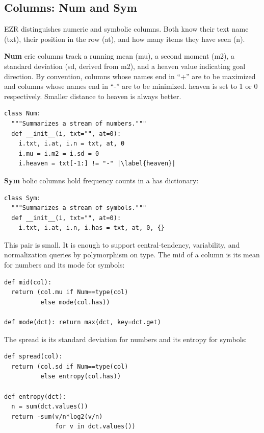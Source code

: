 \documentclass[AMA,STIX2COL]{WileyNJDv5}
\newcommand{\IT}{{\sffamily EZR}}
\newcommand{\cls}[1]{%
  \setlength{\fboxsep}{1.5pt}%
  \colorbox{clsbg}{\sffamily\bfseries{#1}}%
}
\begin{document}
\subsection{Columns: \cls{Num} and \cls{Sym}}

\IT{} distinguishes numeric and symbolic columns. Both know
their text name (\textsf{txt}), their position in the row
(\textsf{at}), and how many items they have seen (\textsf{n}).

\cls{Num}eric columns track a running mean (\textsf{mu}), a
second moment (\textsf{m2}), a standard deviation (\textsf{sd},
derived from \textsf{m2}), and a \textsf{heaven} value
indicating goal direction. By convention, columns whose names
end in ``+'' are to be maximized and columns whose names end in
``-'' are to be minimized. \textsf{heaven} is set to 1 or 0
respectively. Smaller distance to \textsf{heaven} is always
better.

\begin{verbatim}
class Num:
  """Summarizes a stream of numbers."""
  def __init__(i, txt="", at=0):
    i.txt, i.at, i.n = txt, at, 0
    i.mu = i.m2 = i.sd = 0
    i.heaven = txt[-1:] != "-" |\label{heaven}|
\end{verbatim}

\cls{Sym}bolic columns hold frequency counts in a \textsf{has}
dictionary:

\begin{verbatim}
class Sym:
  """Summarizes a stream of symbols."""
  def __init__(i, txt="", at=0):
    i.txt, i.at, i.n, i.has = txt, at, 0, {}
\end{verbatim}

This pair is small. It is enough to support central-tendency,
variability, and normalization queries by polymorphism on type.
The \textsf{mid} of a column is its mean for numbers and its
mode for symbols:

\begin{verbatim}
def mid(col):
  return (col.mu if Num==type(col)
          else mode(col.has))

def mode(dct): return max(dct, key=dct.get)
\end{verbatim}

The \textsf{spread} is its standard deviation for numbers and
its entropy for symbols:

\begin{verbatim}
def spread(col):
  return (col.sd if Num==type(col)
          else entropy(col.has))

def entropy(dct):
  n = sum(dct.values())
  return -sum(v/n*log2(v/n)
              for v in dct.values())
\end{verbatim}
\end{document}
